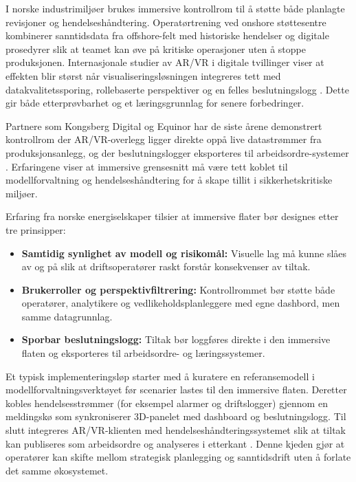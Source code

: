 I norske industrimiljøer brukes immersive kontrollrom til å støtte både planlagte revisjoner og hendelseshåndtering. Operatørtrening ved onshore støttesentre kombinerer sanntidsdata fra offshore-felt med historiske hendelser og digitale prosedyrer slik at teamet kan øve på kritiske operasjoner uten å stoppe produksjonen. Internasjonale studier av AR/VR i digitale tvillinger viser at effekten blir størst når visualiseringsløsningen integreres tett med datakvalitetssporing, rollebaserte perspektiver og en felles beslutningslogg \citep{zhu2021augmented}. Dette gir både etterprøvbarhet og et læringsgrunnlag for senere forbedringer.

Partnere som Kongsberg Digital og Equinor har de siste årene demonstrert kontrollrom der AR/VR-overlegg ligger direkte oppå live datastrømmer fra produksjonsanlegg, og der beslutningslogger eksporteres til arbeidsordre-systemer \citep{kongsberg2023kognitwin}. Erfaringene viser at immersive grensesnitt må være tett koblet til modellforvaltning og hendelseshåndtering for å skape tillit i sikkerhetskritiske miljøer.

Erfaring fra norske energiselskaper tilsier at immersive flater bør designes etter tre prinsipper:
\begin{itemize}
    \item \textbf{Samtidig synlighet av modell og risikomål:} Visuelle lag må kunne slåes av og på slik at driftsoperatører raskt forstår konsekvenser av tiltak.
    \item \textbf{Brukerroller og perspektivfiltrering:} Kontrollrommet bør støtte både operatører, analytikere og vedlikeholdsplanleggere med egne dashbord, men samme datagrunnlag.
    \item \textbf{Sporbar beslutningslogg:} Tiltak bør loggføres direkte i den immersive flaten og eksporteres til arbeidsordre- og læringssystemer.
\end{itemize}

Et typisk implementeringsløp starter med å kuratere en referansemodell i modellforvaltningsverktøyet før scenarier lastes til den immersive flaten. Deretter kobles hendelsesstrømmer (for eksempel alarmer og driftslogger) gjennom en meldingskø som synkroniserer 3D-panelet med dashboard og beslutningslogg. Til slutt integreres AR/VR-klienten med hendelseshåndteringssystemet slik at tiltak kan publiseres som arbeidsordre og analyseres i etterkant \citep{cognite2023akerbp,statnett2024kontrolltarn}. Denne kjeden gjør at operatører kan skifte mellom strategisk planlegging og sanntidsdrift uten å forlate det samme økosystemet.


